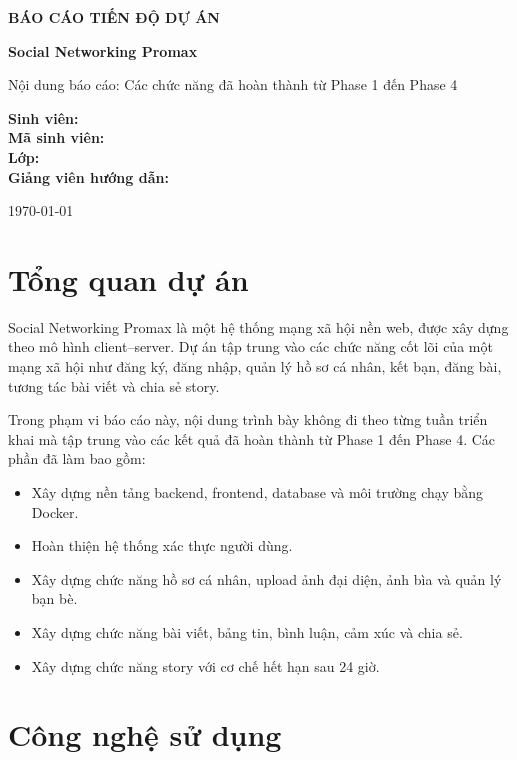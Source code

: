 \documentclass[12pt,a4paper]{article}
\begin{document}
\begin{titlepage}
  \centering
  {\Large \textbf{BÁO CÁO TIẾN ĐỘ DỰ ÁN}\par}
  \vspace{0.5cm}
  {\large \textbf{Social Networking Promax}\par}
  \vspace{1.5cm}
  {\large Nội dung báo cáo: Các chức năng đã hoàn thành từ Phase 1 đến Phase 4\par}
  \vfill
  \begin{flushleft}
    \textbf{Sinh viên:} \dotfill \\
    \textbf{Mã sinh viên:} \dotfill \\
    \textbf{Lớp:} \dotfill \\
    \textbf{Giảng viên hướng dẫn:} \dotfill
  \end{flushleft}
  \vfill
  {\large \today\par}
\end{titlepage}

\tableofcontents
\newpage

\section{Tổng quan dự án}

Social Networking Promax là một hệ thống mạng xã hội nền web, được xây dựng theo mô hình client--server. Dự án tập trung vào các chức năng cốt lõi của một mạng xã hội như đăng ký, đăng nhập, quản lý hồ sơ cá nhân, kết bạn, đăng bài, tương tác bài viết và chia sẻ story.

Trong phạm vi báo cáo này, nội dung trình bày không đi theo từng tuần triển khai mà tập trung vào các kết quả đã hoàn thành từ Phase 1 đến Phase 4. Các phần đã làm bao gồm:

\begin{itemize}
  \item Xây dựng nền tảng backend, frontend, database và môi trường chạy bằng Docker.
  \item Hoàn thiện hệ thống xác thực người dùng.
  \item Xây dựng chức năng hồ sơ cá nhân, upload ảnh đại diện, ảnh bìa và quản lý bạn bè.
  \item Xây dựng chức năng bài viết, bảng tin, bình luận, cảm xúc và chia sẻ.
  \item Xây dựng chức năng story với cơ chế hết hạn sau 24 giờ.
\end{itemize}

\section{Công nghệ sử dụng}
\end{document}
